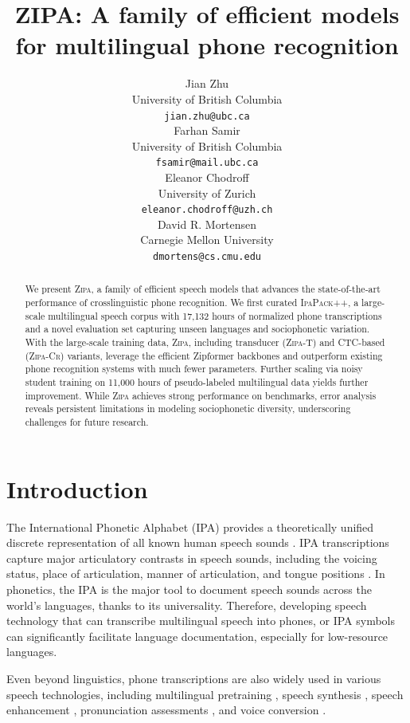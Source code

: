 \documentclass[11pt]{article}
\title{ZIPA: A family of efficient models for multilingual phone recognition}
\author{Jian Zhu \\
  University of British Columbia \\
  \texttt{jian.zhu@ubc.ca} \\\And
  Farhan Samir \\
  University of British Columbia \\
  \texttt{fsamir@mail.ubc.ca} \\\AND
  Eleanor Chodroff \\
  University of Zurich \\
  \texttt{eleanor.chodroff@uzh.ch} \\\And
  David R. Mortensen \\
  Carnegie Mellon University \\
  \texttt{dmortens@cs.cmu.edu}
  }
\begin{document}
\maketitle
\begin{abstract}
We present \textsc{Zipa}, a family of efficient speech models that advances the state-of-the-art performance of crosslinguistic phone recognition. We first curated \textsc{IpaPack++}, a large-scale multilingual speech corpus with 17,132 hours of normalized phone transcriptions and a novel evaluation set capturing unseen languages and sociophonetic variation. With the large-scale training data, \textsc{Zipa}, including transducer (\textsc{Zipa-T}) and CTC-based (\textsc{Zipa-Cr}) variants, leverage the efficient Zipformer backbones and outperform existing phone recognition systems with much fewer parameters. Further scaling via noisy student training on 11,000 hours of pseudo-labeled multilingual data yields further improvement. While \textsc{Zipa} achieves strong performance on benchmarks, error analysis reveals persistent limitations in modeling sociophonetic diversity, underscoring challenges for future research. 
\end{abstract}

\section{Introduction}
The International Phonetic Alphabet (IPA) provides a theoretically unified discrete representation of all known human speech sounds \cite{international1999handbook}. IPA transcriptions capture major articulatory contrasts in speech sounds, including the voicing status, place of articulation, manner of articulation, and tongue positions \cite{ladefoged2014course}. In phonetics, the IPA is the major tool to document speech sounds across the world's languages, thanks to its universality. Therefore, developing speech technology that can transcribe multilingual speech into phones, or IPA symbols can significantly facilitate language documentation, especially for low-resource languages. 

Even beyond linguistics, phone transcriptions are also widely used in various speech technologies, including multilingual pretraining \cite[e.g.,][]{feng23b_interspeech,yusuyin2025whistle}, speech synthesis \cite[e.g.,][]{liu2023pronunciation}, speech enhancement \cite[e.g.,][]{liu2021phoneme,pirklbauer2023evaluation}, pronunciation assessments \cite[e.g.,][]{speechocean762,gong2022transformer}, and voice conversion \cite[e.g.,][]{lee2022duration,shan2024phoneme}. 
\end{document}
